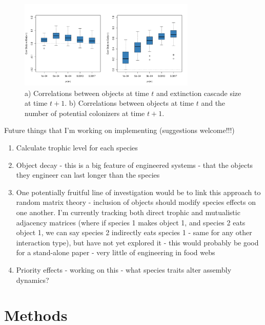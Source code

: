 \documentclass[twocolumn,preprintnumbers,amsmath,amssymb,superscriptaddress]{revtex4}
\begin{document}
\begin{figure}[ht]
\centering
\includegraphics[width=0.75\textwidth]{fig_corrobext_tl2S.pdf}
\caption{
a) Correlations between objects at time $t$ and extinction cascade size at time $t+1$. b) Correlations between objects at time $t$ and the number of potential colonizers at time $t+1$.
}
\label{fig_corrobext}
\end{figure} 


Future things that I'm working on implementing (suggestions welcome!!!)
\begin{enumerate}
\item Calculate trophic level for each species
\item Object decay - this is a big feature of engineered systems - that the objects they engineer can last longer than the species
\item One potentially fruitful line of investigation would be to link this approach to random matrix theory - inclusion of objects should modify species effects on one another. I'm currently tracking both direct trophic and mutualistic adjacency matrices (where if species 1 makes object 1, and species 2 eats object 1, we can say species 2 indirectly eats species 1 - same for any other interaction type), but have not yet explored it - this would probably be good for a stand-alone paper - very little of engineering in food webs
\item Priority effects - working on this - what species traits alter assembly dynamics?
\end{enumerate}



\section{Methods}
\end{document}
